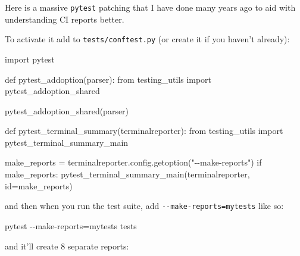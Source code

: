 \documentclass[
]{report}
\newenvironment{Shaded}{\begin{snugshade}}{\end{snugshade}}
\newcommand{\AttributeTok}[1]{\textcolor[rgb]{0.40,0.45,0.13}{#1}}
\newcommand{\BuiltInTok}[1]{\textcolor[rgb]{0.00,0.23,0.31}{#1}}
\newcommand{\ControlFlowTok}[1]{\textcolor[rgb]{0.00,0.23,0.31}{#1}}
\newcommand{\ExtensionTok}[1]{\textcolor[rgb]{0.00,0.23,0.31}{#1}}
\newcommand{\ImportTok}[1]{\textcolor[rgb]{0.00,0.46,0.62}{#1}}
\newcommand{\KeywordTok}[1]{\textcolor[rgb]{0.00,0.23,0.31}{#1}}
\newcommand{\NormalTok}[1]{\textcolor[rgb]{0.00,0.23,0.31}{#1}}
\newcommand{\OperatorTok}[1]{\textcolor[rgb]{0.37,0.37,0.37}{#1}}
\newcommand{\StringTok}[1]{\textcolor[rgb]{0.13,0.47,0.30}{#1}}
\begin{document}
Here is a massive \texttt{pytest} patching that I have done many years
ago to aid with understanding CI reports better.

To activate it add to \texttt{tests/conftest.py} (or create it if you
haven't already):

\begin{Shaded}
\begin{Highlighting}[]
\ImportTok{import}\NormalTok{ pytest}

\KeywordTok{def}\NormalTok{ pytest\_addoption(parser):}
    \ImportTok{from}\NormalTok{ testing\_utils }\ImportTok{import}\NormalTok{ pytest\_addoption\_shared}

\NormalTok{    pytest\_addoption\_shared(parser)}


\KeywordTok{def}\NormalTok{ pytest\_terminal\_summary(terminalreporter):}
    \ImportTok{from}\NormalTok{ testing\_utils }\ImportTok{import}\NormalTok{ pytest\_terminal\_summary\_main}

\NormalTok{    make\_reports }\OperatorTok{=}\NormalTok{ terminalreporter.config.getoption(}\StringTok{"{-}{-}make{-}reports"}\NormalTok{)}
    \ControlFlowTok{if}\NormalTok{ make\_reports:}
\NormalTok{        pytest\_terminal\_summary\_main(terminalreporter, }\BuiltInTok{id}\OperatorTok{=}\NormalTok{make\_reports)}
\end{Highlighting}
\end{Shaded}

and then when you run the test suite, add
\texttt{-\/-make-reports=mytests} like so:

\begin{Shaded}
\begin{Highlighting}[]
\ExtensionTok{pytest} \AttributeTok{{-}{-}make{-}reports}\OperatorTok{=}\NormalTok{mytests tests}
\end{Highlighting}
\end{Shaded}

and it'll create 8 separate reports:

\begin{Shaded}
\end{Shaded}
\end{document}
